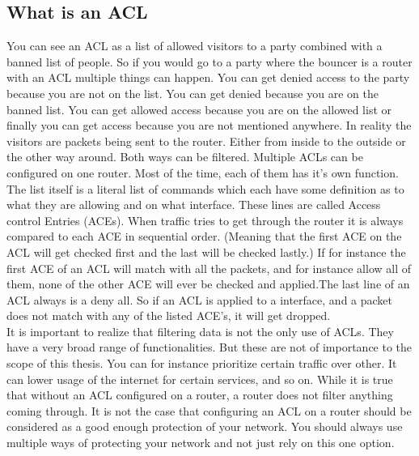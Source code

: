 \subsection{What is an ACL}
You can see an ACL as a list of allowed visitors to a party combined with a banned list of people. So if you would go to a party where the bouncer is a router with an ACL multiple things can happen. You can get denied access to the party because you are not on the list. You can get denied because you are on the banned list. You can get allowed access because you are on the allowed list or finally you can get access because you are not mentioned anywhere.
In reality the visitors are packets being sent to the router. Either from inside to the outside or the other way around. Both ways can be filtered. Multiple ACLs can be configured on one router. Most of the time, each of them has it's own function. The list itself is a literal list of commands which each have some definition as to what they are allowing and on what interface. These lines are called Access control Entries (ACEs). When traffic tries to get through the router it is always compared to each ACE in sequential order. (Meaning that the first ACE on the ACL will get checked first and the last will be checked lastly.) If for instance the first ACE of an ACL will match with all the packets, and for instance allow all of them, none of the other ACE will ever be checked and applied.The last line of an ACL always is a deny all. So if an ACL is applied to a interface, and a packet does not match with any of the listed ACE's, it will get dropped. \\
It is important to realize that filtering data is not the only use of ACLs. They have a very broad range of functionalities. But these are not of importance to the scope of this thesis. You can for instance prioritize certain traffic over other. It can lower usage of the internet for certain services, and so on.
While it is true that without an ACL configured on a router, a router does not filter anything coming through. It is not the case that configuring an ACL on a router should be considered as a good enough protection of your network. You should always use multiple ways of protecting your network and not just rely on this one option.
